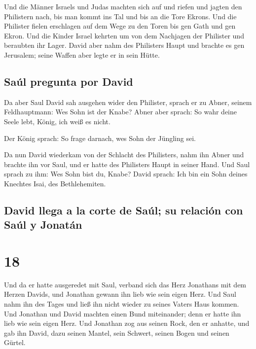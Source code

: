  Und die Männer Israels und Judas machten sich auf und
riefen und jagten den Philistern nach, bis man kommt ins Tal und bis an
die Tore Ekrons. Und die Philister fielen erschlagen auf dem Wege zu den
Toren bis gen Gath und gen Ekron.  Und die Kinder Israel
kehrten um von dem Nachjagen der Philister und beraubten ihr Lager.
 David aber nahm des Philisters Haupt und brachte es gen
Jerusalem; seine Waffen aber legte er in sein Hütte.

\hypertarget{sauxfal-pregunta-por-david}{%
\subsection{Saúl pregunta por David}\label{sauxfal-pregunta-por-david}}

 Da aber Saul David sah ausgehen wider den Philister,
sprach er zu Abner, seinem Feldhauptmann: Wes Sohn ist der Knabe? Abner
aber sprach: So wahr deine Seele lebt, König, ich weiß es nicht.

 Der König sprach: So frage darnach, wes Sohn der
Jüngling sei.

 Da nun David wiederkam von der Schlacht des Philisters,
nahm ihn Abner und brachte ihn vor Saul, und er hatte des Philisters
Haupt in seiner Hand.  Und Saul sprach zu ihm: Wes Sohn
bist du, Knabe? David sprach: Ich bin ein Sohn deines Knechtes Isai, des
Bethlehemiten.

\hypertarget{david-llega-a-la-corte-de-sauxfal-su-relaciuxf3n-con-sauxfal-y-jonatuxe1n}{%
\subsection{David llega a la corte de Saúl; su relación con Saúl y
Jonatán}\label{david-llega-a-la-corte-de-sauxfal-su-relaciuxf3n-con-sauxfal-y-jonatuxe1n}}

\hypertarget{section-17}{%
\section{18}\label{section-17}}

 Und da er hatte ausgeredet mit Saul, verband sich das
Herz Jonathans mit dem Herzen Davids, und Jonathan gewann ihn lieb wie
sein eigen Herz.  Und Saul nahm ihn des Tages und ließ ihn
nicht wieder zu seines Vaters Haus kommen.  Und Jonathan
und David machten einen Bund miteinander; denn er hatte ihn lieb wie
sein eigen Herz.  Und Jonathan zog aus seinen Rock, den er
anhatte, und gab ihn David, dazu seinen Mantel, sein Schwert, seinen
Bogen und seinen Gürtel.

